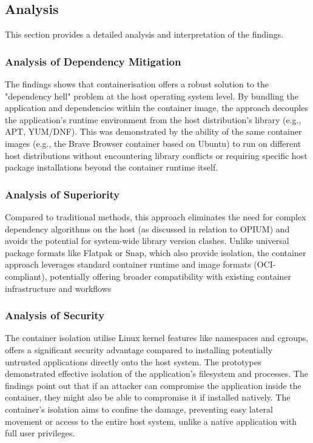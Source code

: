 \documentclass[journal,onecolumn]{IEEEtran}
\begin{document}
\subsection{Analysis}
This section provides a detailed analysis and interpretation of the findings.

\subsubsection{Analysis of Dependency Mitigation}
The findings shows that containerisation offers a robust solution to the "dependency hell" problem at the host operating system level. By bundling the application and dependencies within the container image, the approach decouples the application's runtime environment from the host distribution's library (e.g., APT, YUM/DNF). This was demonstrated by the ability of the same container images (e.g., the Brave Browser container based on Ubuntu) to run on different host distributions without encountering library conflicts or requiring specific host package installations beyond the container runtime itself.

\subsubsection{Analysis of Superiority}
Compared to traditional methods, this approach eliminates the need for complex dependency algorithms on the host (as discussed in relation to OPIUM\cite{10.1109/ICSE.2007.59}) and avoids the potential for system-wide library version clashes. Unlike universal package formats like Flatpak or Snap, which also provide isolation, the container approach leverages standard container runtime and image formats (OCI-compliant), potentially offering broader compatibility with existing container infrastructure and workflows

\subsubsection{Analysis of Security}
The container isolation utilise Linux kernel features like namespaces and cgroups, offers a significant security advantage compared to installing potentially untrusted applications directly onto the host system. The prototypes demonstrated effective isolation of the application's filesystem and processes. The findings point out that if an attacker can compromise the application inside the container, they might also be able to compromise it if installed natively. The container's isolation aims to confine the damage, preventing easy lateral movement or access to the entire host system, unlike a native application with full user privileges.
\end{document}
